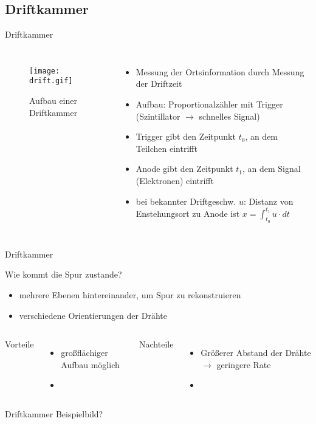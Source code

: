 \subsection[]{Driftkammer}

\begin{frame}{Driftkammer}
    \begin{columns}[T]
			\begin{figure}[htbp]
			  \centering
			  \texttt{[image: drift.gif]}
			  \caption{Aufbau einer Driftkammer}
			\end{figure}
			
	    	\begin{itemize}
	    	  \item Messung der Ortsinformation durch Messung der Driftzeit
			  \item Aufbau: Proportionalzähler mit Trigger (Szintillator $\rightarrow$ schnelles Signal)
			  \item Trigger gibt den Zeitpunkt $t_0$, an dem Teilchen eintrifft
			  \item Anode gibt den Zeitpunkt $t_1$, an dem Signal (Elektronen) eintrifft
			  \item bei bekannter Driftgeschw. $u$: Distanz von Enstehungsort zu Anode ist
			  $x=\int_{t_0}^{t_1}u\cdot dt$
			\end{itemize}
			
    \end{columns}
\end{frame}

\begin{frame}{Driftkammer}

	\begin{block}{Wie kommt die Spur zustande?}
		\begin{itemize}
		  \item mehrere Ebenen hintereinander, um Spur zu rekonstruieren
		  \item verschiedene Orientierungen der Drähte
		\end{itemize}
	\end{block}
	\vspace{0.8cm}
    \begin{columns}[T]
			Vorteile		
			\begin{itemize}
			  \item großflächiger Aufbau möglich
			  \item
			\end{itemize}	
	    	Nachteile
	    	\begin{itemize}
			  \item Größerer Abstand der Drähte $\rightarrow$ geringere Rate
			  \item 
			\end{itemize}
    \end{columns}
    \vspace{1cm}
\end{frame}

\begin{frame}{Driftkammer}
    Beispielbild?
\end{frame}
